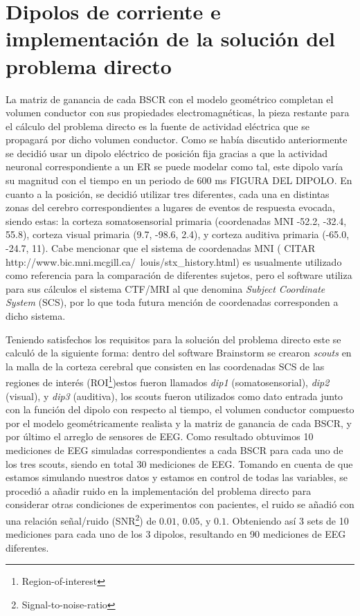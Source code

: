 \section{Dipolos de corriente e implementación de la solución del problema directo}
\label{sec:methodology:direct_solved}

La matriz de ganancia de cada BSCR con el modelo geométrico completan el volumen conductor con sus propiedades electromagnéticas, la pieza restante para el cálculo del problema directo es la fuente de actividad eléctrica que se propagará por dicho volumen conductor. Como se había discutido anteriormente se decidió usar un dipolo eléctrico de posición fija gracias a que la actividad neuronal correspondiente a un ER se puede modelar como tal, este dipolo varía su magnitud con el tiempo en un periodo de 600 ms FIGURA DEL DIPOLO. En cuanto a la posición, se decidió utilizar tres diferentes, cada una en distintas zonas del cerebro correspondientes a lugares de eventos de respuesta evocada, siendo estas: la corteza somatosensorial primaria (coordenadas MNI -52.2, -32.4, 55.8), corteza visual primaria (9.7, -98.6, 2.4), y corteza auditiva primaria (-65.0, -24.7, 11). Cabe mencionar que el sistema de coordenadas MNI ( CITAR http://www.bic.mni.mcgill.ca/~louis/stx\_history.html) es usualmente utilizado como referencia para la comparación de diferentes sujetos, pero el software utiliza para sus cálculos el sistema CTF/MRI al que denomina \emph{Subject Coordinate System} (SCS), por lo que toda futura mención de coordenadas corresponden a dicho sistema.

Teniendo satisfechos los requisitos para la solución del problema directo este se calculó de la siguiente forma: dentro del software Brainstorm se crearon \emph{scouts} en la malla de la corteza cerebral que consisten en las coordenadas SCS de las regiones de interés (ROI\footnote{Region-of-interest})estos fueron llamados \emph{dip1} (somatosensorial), \emph{dip2} (visual), y \emph{dip3} (auditiva), los scouts fueron utilizados como dato entrada junto con la función del dipolo con respecto al tiempo, el volumen conductor compuesto por el modelo geométricamente realista y la matriz de ganancia de cada BSCR, y por último el arreglo de sensores de EEG. Como resultado obtuvimos 10 mediciones de EEG simuladas correspondientes a cada BSCR para cada uno de los tres scouts, siendo en total 30 mediciones de EEG. Tomando en cuenta de que estamos simulando nuestros datos y estamos en control de todas las variables, se procedió a añadir ruido en la implementación del problema directo para considerar otras condiciones de experimentos con pacientes, el ruido se añadió con una relación señal/ruido (SNR\footnote{Signal-to-noise-ratio}) de $0.01\text{, } 0.05\text{, } \text{y } 0.1$. Obteniendo así 3 sets de 10 mediciones para cada uno de los 3 dipolos, resultando en 90 mediciones de EEG diferentes.


